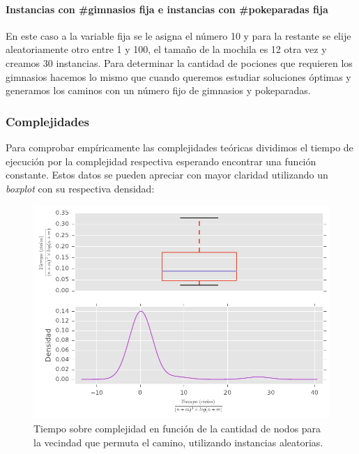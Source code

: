 \paragraph{Instancias con \#gimnasios fija e instancias con \#pokeparadas fija}
En este caso a la variable fija se le asigna el n\'umero 10 y para la restante se elije aleatoriamente otro entre 1 y 100, el tamaño de la mochila es 12 otra vez y creamos 30 instancias. Para determinar la cantidad de pociones que requieren los gimnasios hacemos lo mismo que cuando queremos estudiar soluciones \'optimas y generamos los caminos con un n\'umero fijo de gimnasios y pokeparadas.

\subsubsection{Complejidades}

Para comprobar emp\'iricamente las complejidades te\'oricas dividimos el tiempo de ejecuci\'on por la complejidad respectiva esperando encontrar una funci\'on constante. Estos datos se pueden apreciar con mayor claridad utilizando un \textit{boxplot} con su respectiva densidad:

\begin{figure}[H]
  \begin{center}
    \includegraphics{../experimentacion/ej3/expAleat_complejidad_permutaCamino.pdf}
    \caption{Tiempo sobre complejidad en funci\'on de la cantidad de nodos para la vecindad que permuta el camino, utilizando instancias aleatorias.}
    \label{fig:ej3_expAleat_complejidad_permutaCamino}
  \end{center}
\end{figure}


